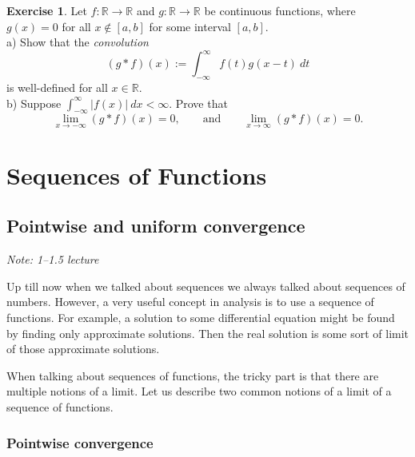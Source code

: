 \documentclass[12pt]{book}
\newcommand{\abs}[1]{\left\lvert {#1} \right\rvert}
\newcommand{\R}{{\mathbb{R}}}
\newcommand{\myindex}[1]{#1\index{#1}}
\newcommand{\sectionnotes}[1]{\noindent \emph{Note: #1} \medskip \par}
\theoremstyle{plain}
\theoremstyle{remark}
\theoremstyle{definition}
\theoremstyle{exercise}
\newtheorem{exercise}{Exercise}[section]
\theoremstyle{example}
\begin{document}
\begin{exercise}
Let $f \colon \R \to \R$ and 
$g \colon \R \to \R$ be continuous functions, where
$g(x) = 0$ for all $x \notin [a,b]$ for some interval $[a,b]$.
\\
a) Show that the
\emph{\myindex{convolution}}
\begin{equation*}
(g * f)(x) := \int_{-\infty}^\infty f(t)g(x-t)~dt 
\end{equation*}
is well-defined for all $x \in \R$.
\\
b) Suppose $\int_{-\infty}^\infty \abs{f(x)}~dx < \infty$.  Prove that
\begin{equation*}
\lim_{x \to -\infty} (g * f)(x) = 0, \qquad \text{and} \qquad
\lim_{x \to \infty} (g * f)(x) = 0 .
\end{equation*}
\end{exercise}


\chapter{Sequences of Functions} \label{fs:chapter}


\section{Pointwise and uniform convergence}
\label{sec:puconv}

\sectionnotes{1--1.5 lecture}

Up till now when we talked about sequences we always talked about
sequences of numbers.  However, a very useful concept in analysis is to use a
sequence of functions.  For example, a solution to some
differential equation
might be found by finding only approximate solutions.  Then the real solution is
some sort of limit of those approximate solutions.

When talking about sequences of functions, the 
tricky part is that there are multiple notions of a limit.
Let us describe two common
notions of a limit of a sequence of functions.

\subsection{Pointwise convergence}
\end{document}
